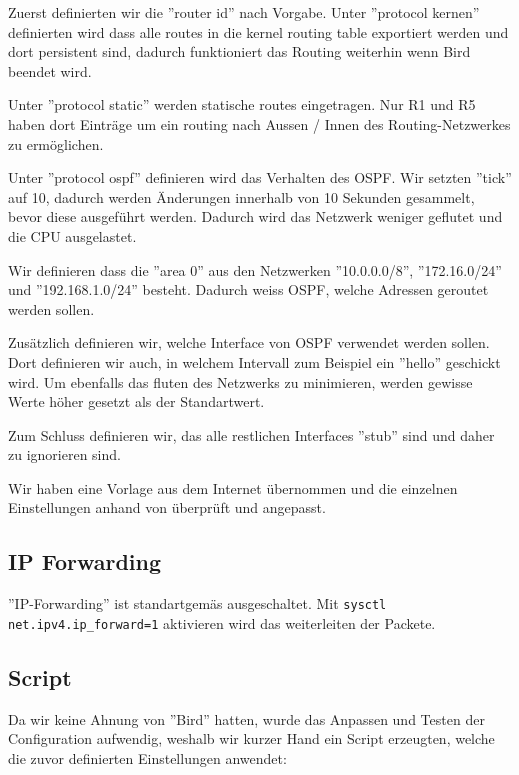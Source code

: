 \documentclass[11pt,titlepage]{article}
\begin{document}
Zuerst definierten wir die ''router id'' nach Vorgabe.
\medskip
Unter ''protocol kernen'' definierten wird dass alle routes in die kernel routing table exportiert werden und dort persistent sind, dadurch funktioniert das Routing weiterhin wenn Bird beendet wird.

\medskip
Unter ''protocol static'' werden statische routes eingetragen. Nur R1 und R5 haben dort Einträge um ein routing nach Aussen / Innen des Routing-Netzwerkes zu ermöglichen.

\medskip
Unter ''protocol ospf'' definieren wird das Verhalten des OSPF. Wir setzten ''tick'' auf 10, dadurch werden Änderungen innerhalb von 10 Sekunden gesammelt, bevor diese ausgeführt werden. Dadurch wird das Netzwerk weniger geflutet und die CPU ausgelastet.

Wir definieren dass die ''area 0'' aus den Netzwerken ''10.0.0.0/8'', ''172.16.0/24'' und ''192.168.1.0/24'' besteht. Dadurch weiss OSPF, welche Adressen geroutet werden sollen.

Zusätzlich definieren wir, welche Interface von OSPF verwendet werden sollen. Dort definieren wir auch, in welchem Intervall zum Beispiel ein ''hello'' geschickt wird.
Um ebenfalls das fluten des Netzwerks zu minimieren, werden gewisse Werte höher gesetzt als der Standartwert.

Zum Schluss definieren wir, das alle restlichen Interfaces ''stub'' sind und daher zu ignorieren sind.

\medskip
Wir haben eine Vorlage aus dem Internet übernommen \cite{BIRD_EXAMPLE} und die einzelnen Einstellungen anhand von \cite{BIRD_DOC} überprüft und angepasst.

\subsection{IP Forwarding}
\label{subsec:IPForwarding}

''IP-Forwarding'' ist standartgemäs ausgeschaltet. Mit \lstinline{sysctl net.ipv4.ip_forward=1} aktivieren wird das weiterleiten der Packete.

\par\medskip

\subsection{Script}
\label{subsec:Script}

Da wir keine Ahnung von ''Bird'' hatten, wurde das Anpassen und Testen der Configuration aufwendig, weshalb wir kurzer Hand ein Script erzeugten, welche die zuvor definierten Einstellungen anwendet:
\end{document}
